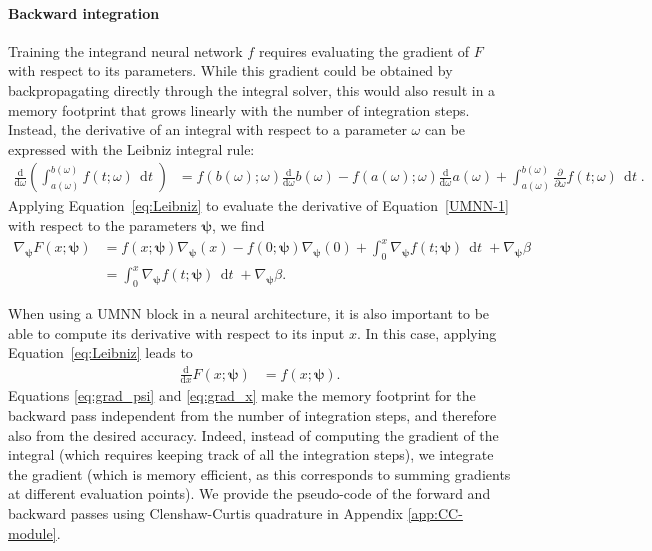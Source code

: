 \documentclass{article}
\newcommand{\mathbf}{\boldsymbol}
\DeclareMathOperator{\dt}{\, \mathrm{d}\mathit{t}}
\newcommand{\brac}[1]{\left({#1}\right)}
\begin{document}
\paragraph{Backward integration}
Training the integrand neural network $f$ requires evaluating the gradient of $F$ with respect to its parameters. While this gradient could be obtained by backpropagating directly through the integral solver, this would also result in a memory footprint that grows linearly with the number of integration steps. Instead, the derivative of an integral with respect to a parameter $\omega$ can be expressed with the Leibniz integral rule:
\begin{align}
    \frac{\mathrm{d}}{\mathrm{d} \omega}\brac{\int^{b(\omega)}_{a(\omega)}f(t; \omega) \dt} &= f(b(\omega); \omega) \frac{\mathrm{d}}{\mathrm{d} \omega}b(\omega) - f(a(\omega);\omega) \frac{\mathrm{d}}{\mathrm{d}\omega}a(\omega) + \int^{b(\omega)}_{a(\omega)} \frac{\partial}{\partial \omega}f(t; \omega) \dt. \label{eq:Leibniz}
\end{align}
Applying Equation~\eqref{eq:Leibniz} to evaluate the derivative of Equation~\eqref{UMNN-1} with respect to the parameters $\mathbf{\psi}$, we find
\begin{align}
    \nabla_{\mathbf{\psi}} F(x; \mathbf{\psi}) &= f(x; \mathbf{\psi}) \nabla_{\mathbf{\psi}}\brac{x} - f(0; \mathbf{\psi}) \nabla_{\mathbf{\psi}}\brac{0} + \int^x_0 \nabla_{\mathbf{\psi}} f(t; \mathbf{\psi}) \dt + \nabla_{\mathbf{\psi}}\beta\nonumber \\
    &= \int^x_0 \nabla_{\mathbf{\psi}} f(t; \mathbf{\psi}) \dt + \nabla_{\mathbf{\psi}}\beta. \label{eq:grad_psi}
\end{align}

When using a UMNN block in a neural architecture, it is also important to be able to compute its derivative with respect to its input $x$. In this case, applying Equation~\eqref{eq:Leibniz} leads to
\begin{align}
    \frac{\mathrm{d}}{\mathrm{d}x}F(x; \mathbf{\psi}) &= f(x; \mathbf{\psi}).\label{eq:grad_x}
\end{align}
Equations \eqref{eq:grad_psi} and \eqref{eq:grad_x} make the memory footprint for the backward pass independent from the number of integration steps, and therefore also from the desired accuracy. Indeed, instead of computing the gradient of the integral (which requires keeping track of all the integration steps), we integrate the gradient (which is memory efficient, as this corresponds to summing gradients at different evaluation points). We provide the pseudo-code of the forward and backward passes using Clenshaw-Curtis quadrature in Appendix \ref{app:CC-module}.
\end{document}
